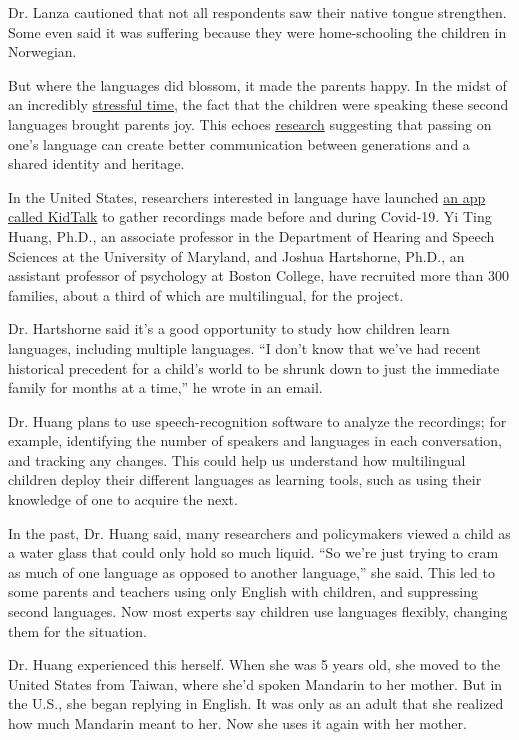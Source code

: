 Dr. Lanza cautioned that not all respondents saw their native tongue
strengthen. Some even said it was suffering because they were
home-schooling the children in Norwegian.

But where the languages did blossom, it made the parents happy. In the
midst of an incredibly
\href{https://www.ox.ac.uk/news/2020-05-06-major-stressors-parents-during-covid-19-revealed-new-report-0}{stressful
time}, the fact that the children were speaking these second languages
brought parents joy. This echoes
\href{https://journals.sagepub.com/doi/full/10.1177/1367006920920939}{research}
suggesting that passing on one's language can create better
communication between generations and a shared identity and heritage.

In the United States, researchers interested in language have launched
\href{https://kidtalk.app/home}{an app called KidTalk} to gather
recordings made before and during Covid-19. Yi Ting Huang, Ph.D., an
associate professor in the Department of Hearing and Speech Sciences at
the University of Maryland, and Joshua Hartshorne, Ph.D., an assistant
professor of psychology at Boston College, have recruited more than 300
families, about a third of which are multilingual, for the project.

Dr. Hartshorne said it's a good opportunity to study how children learn
languages, including multiple languages. ``I don't know that we've had
recent historical precedent for a child's world to be shrunk down to
just the immediate family for months at a time,'' he wrote in an email.

Dr. Huang plans to use speech-recognition software to analyze the
recordings; for example, identifying the number of speakers and
languages in each conversation, and tracking any changes. This could
help us understand how multilingual children deploy their different
languages as learning tools, such as using their knowledge of one to
acquire the next.

In the past, Dr. Huang said, many researchers and policymakers viewed a
child as a water glass that could only hold so much liquid. ``So we're
just trying to cram as much of one language as opposed to another
language,'' she said. This led to some parents and teachers using only
English with children, and suppressing second languages. Now most
experts say children use languages flexibly, changing them for the
situation.

Dr. Huang experienced this herself. When she was 5 years old, she moved
to the United States from Taiwan, where she'd spoken Mandarin to her
mother. But in the U.S., she began replying in English. It was only as
an adult that she realized how much Mandarin meant to her. Now she uses
it again with her mother.

